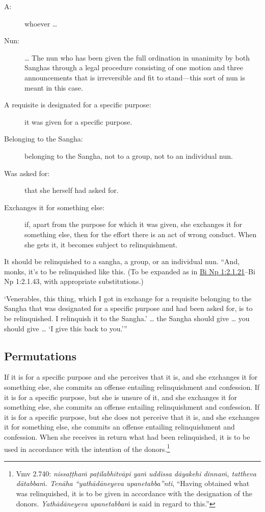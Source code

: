 \documentclass[12pt,openany]{book}%
\begin{document}
\begin{description}%
\item[A: ] whoever … %
\item[Nun: ] … The nun who has been given the full ordination in unanimity by both Sanghas through a legal procedure consisting of one motion and three announcements that is irreversible and fit to stand—this sort of nun is meant in this case. %
\item[A requisite is designated for a specific purpose: ] it was given for a specific purpose. %
\item[Belonging to the Sangha: ] belonging to the Sangha, not to a group, not to an individual nun. %
\item[Was asked for: ] that she herself had asked for. %
\item[Exchanges it for something else: ] if, apart from the purpose for which it was given, she exchanges it for something else, then for the effort there is an act of wrong conduct. When she gets it, it becomes subject to relinquishment. %
\end{description}

It should be relinquished to a sangha, a group, or an individual nun. “And, monks, it’s to be relinquished like this.  (To be expanded as in \href{https://suttacentral.net/pli-tv-bi-vb-np1/en/brahmali\#2.1.21}{Bi Np 1:2.1.21}–Bi Np 1:2.1.43, with appropriate substitutions.) 

‘Venerables, this thing, which I got in exchange for a requisite belonging to the Sangha that was designated for a specific purpose and had been asked for, is to be relinquished. I relinquish it to the Sangha.’ … the Sangha should give … you should give … ‘I give this back to you.’” 

\subsection*{Permutations }

If it is for a specific purpose and she perceives that it is, and she exchanges it for something else, she commits an offense entailing relinquishment and confession. If it is for a specific purpose, but she is unsure of it, and she exchanges it for something else, she commits an offense entailing relinquishment and confession. If it is for a specific purpose, but she does not perceive that it is, and she exchanges it for something else, she commits an offense entailing relinquishment and confession. When she receives in return what had been relinquished, it is to be used in accordance with the intention of the donors.\footnote{Vmv 2.740: \textit{\textsanskrit{nissaṭṭhaṁ} \textsanskrit{paṭilabhitvāpi} \textsanskrit{yaṁ} uddissa \textsanskrit{dāyakehi} \textsanskrit{dinnaṁ}, tattheva \textsanskrit{dātabbaṁ}. \textsanskrit{Tenāha} “\textsanskrit{yathādāneyeva} upanetabba”nti}, “Having obtained what was relinquished, it is to be given in accordance with the designation of the donors. \textit{\textsanskrit{Yathādāneyeva} \textsanskrit{upanetabbaṁ}} is said in regard to this.” } 
\end{document}
